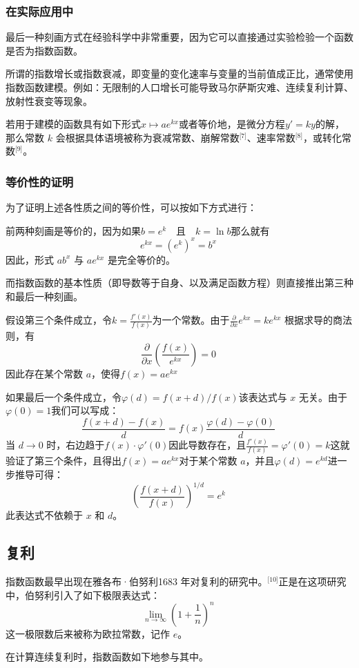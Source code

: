 \subsubsection{在实际应用中}
最后一种刻画方式在经验科学中非常重要，因为它可以直接通过实验检验一个函数是否为指数函数。

所谓的指数增长或指数衰减，即变量的变化速率与变量的当前值成正比，通常使用指数函数建模。例如：无限制的人口增长可能导致马尔萨斯灾难、连续复利计算、放射性衰变等现象。

若用于建模的函数具有如下形式$x \mapsto a e^{kx}$或者等价地，是微分方程$y' = k y$的解，那么常数 $k$ 会根据具体语境被称为衰减常数、崩解常数\(^\text{[7]}\)、速率常数\(^\text{[8]}\)，或转化常数\(^\text{[9]}\)。
\subsubsection{等价性的证明}
为了证明上述各性质之间的等价性，可以按如下方式进行：

前两种刻画是等价的，因为如果$b = e^k \quad \text{且} \quad k = \ln b$那么就有
$$
e^{k x} = (e^k)^x = b^x~
$$
因此，形式 $a b^x$ 与 $a e^{k x}$ 是完全等价的。

而指数函数的基本性质（即导数等于自身、以及满足函数方程）则直接推出第三种和最后一种刻画。

假设第三个条件成立，令$k = \frac{f'(x)}{f(x)}$为一个常数。由于$\frac{\partial}{\partial x} e^{k x} = k e^{k x}$
根据求导的商法则，有
$$
\frac{\partial}{\partial x} \left( \frac{f(x)}{e^{k x}} \right) = 0~
$$
因此存在某个常数 $a$，使得$f(x) = a e^{k x}$

如果最后一个条件成立，令$\varphi(d) = f(x + d)/f(x)$该表达式与 $x$ 无关。由于$\varphi(0) = 1$我们可以写成：
$$
\frac{f(x + d) - f(x)}{d} = f(x)\frac{\varphi(d) - \varphi(0)}{d}~
$$
当 $d \to 0$ 时，右边趋于$f(x) \cdot \varphi'(0)$因此导数存在，且$\frac{f'(x)}{f(x)} = \varphi'(0) = k$这就验证了第三个条件，且得出$f(x) = a e^{k x}$对于某个常数 $a$，并且$\varphi(d) = e^{k d}$进一步推导可得：
$$
\left( \frac{f(x + d)}{f(x)} \right)^{1/d} = e^k~
$$
此表达式不依赖于 $x$ 和 $d$。
\subsection{复利}
指数函数最早出现在雅各布·伯努利1683 年对复利的研究中。\(^\text{[10]}\)正是在这项研究中，伯努利引入了如下极限表达式：
$$
\lim_{n \to \infty} \left(1 + \frac{1}{n}\right)^n~
$$
这一极限数后来被称为欧拉常数，记作 $e$。

在计算连续复利时，指数函数如下地参与其中。

